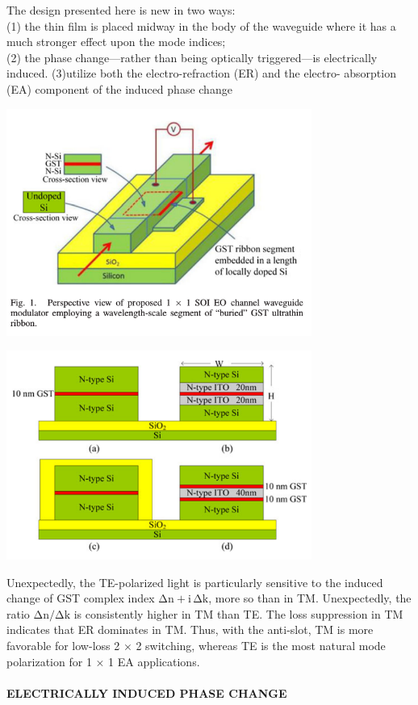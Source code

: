 \documentclass[]{article}
\let\oldparagraph\paragraph
\renewcommand{\paragraph}[1]{\oldparagraph{#1}\mbox{}}
\begin{document}
The design presented here is new in two ways:\\
(1) the thin film is placed midway in the body of the waveguide where it
has a much stronger effect upon the mode indices;\\
(2) the phase change---rather than being optically triggered---is
electrically induced. (3)utilize both the electro-refraction (ER) and
the electro- absorption (EA) component of the induced phase change\\
\centerline{\includegraphics[width=10cm]{image/004_01.png}} \centerline{\includegraphics[width=10cm]{image/004_02.png}}

Unexpectedly, the TE-polarized light is particularly sensitive to the
induced change of GST complex index \(\mathrm{\Delta n + i\,\Delta k}\),
more so than in TM. Unexpectedly, the ratio
\(\mathrm{{\Delta n}/{\Delta k}}\) is consistently higher in TM than TE.
The loss suppression in TM indicates that ER dominates in TM. Thus, with
the anti-slot, TM is more favorable for low-loss 2 × 2 switching,
whereas TE is the most natural mode polarization for 1 × 1 EA
applications.

\newpage
\paragraph{ELECTRICALLY INDUCED PHASE
CHANGE}\label{electrically-induced-phase-change}
\end{document}
